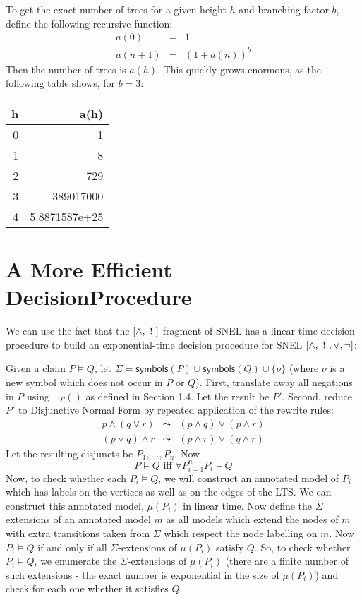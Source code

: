 To get the exact number of trees for a given height $h$ and branching factor $b$, define the following recursive function:
\begin{eqnarray}
a(0) & = & 1\nonumber \\
a(n+1) & = & (1+a(n))^b \nonumber
\end{eqnarray}
Then the number of trees is $a(h)$.
This quickly grows enormous, as the following table shows, for $b = 3$:
\begin{center}
\begin{tabular}{ r | r }
h & a(h) \\
\hline
0 & 1 \\
1 & 8 \\
2 & 729 \\
3 & 389017000 \\
4 & 5.8871587e+25 \\
\end{tabular}
\end{center}
    
\section{A More Efficient DecisionProcedure}
We can use the fact that the $[\land, \ ! \ ]$ fragment of SNEL has a linear-time decision procedure to build an exponential-time decision procedure for SNEL $[\land, \ ! \ , \lor ,\neg]$:

Given a claim $P \models Q$, let $\Sigma = \mathsf{symbols}(P) \cup \mathsf{symbols}(Q) \cup \{\nu\}$ (where $\nu$ is a new symbol which does not occur in $P$ or $Q$).
First, translate away all negations in $P$ using $\neg_\Sigma()$ as defined in Section 1.4.
Let the result be $P'$.
Second, reduce $P'$ to Disjunctive Normal Form by repeated application of the rewrite rules:
\begin{eqnarray}
p \land (q \lor r) & \leadsto & (p \land q) \lor (p \land r) \nonumber \\
(p \lor q) \land r & \leadsto & (p \land r) \lor (q \land r) \nonumber
\end{eqnarray}
Let the resulting disjuncts be $P_1, ..., P_n$. 
Now 
\[
P \models Q \mbox{ iff } \forall P_{i=1}^n P_i \models Q
\]
Now, to check whether each $P_i \models Q$, we will construct an annotated model of $P_i$ which has labels on the vertices as well as on the edges of the LTS. We can construct this annotated model, $\mu(P_i)$ in linear time. 
Now define the $\Sigma$ extensions of an annotated model $m$ as all models which extend the nodes of $m$ with extra transitions taken from $\Sigma$ which respect the node labelling on $m$.
Now $P_i \models Q$ if and only if all $\Sigma$-extensions of $\mu(P_i)$ satisfy $Q$.
So, to check whether $P_i \models Q$, we enumerate the $\Sigma$-extensions of $\mu(P_i)$ (there are a finite number of such extensions - the exact number is exponential in the size of $\mu(P_i)$) and check for each one whether it satisfies $Q$.

